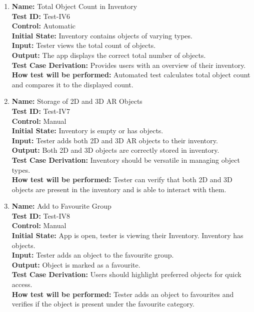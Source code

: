 \documentclass[12pt, titlepage]{article}
\begin{document}
\begin{enumerate}
  \item \textbf{Name:} Total Object Count in Inventory \label{itm:Test-IV6} \\
        \textbf{Test ID:} Test-IV6 \\
        \textbf{Control:} Automatic \\
        \textbf{Initial State:} Inventory contains objects of varying types. \\
        \textbf{Input:} Tester views the total count of objects. \\
        \textbf{Output:} The app displays the correct total number of objects. \\
        \textbf{Test Case Derivation:} Provides users with an overview of their inventory. \\
        \textbf{How test will be performed:} Automated test calculates total object count and compares it to the displayed count. \\

  \item \textbf{Name:} Storage of 2D and 3D AR Objects \label{itm:Test-IV7} \\
        \textbf{Test ID:} Test-IV7 \\
        \textbf{Control:} Manual \\
        \textbf{Initial State:} Inventory is empty or has objects. \\
        \textbf{Input:} Tester adds both 2D and 3D AR objects to their inventory. \\
        \textbf{Output:} Both 2D and 3D objects are correctly stored in inventory. \\
        \textbf{Test Case Derivation:} Inventory should be versatile in managing object types. \\
        \textbf{How test will be performed:} Tester can verify that both 2D and 3D objects are present in the inventory and is able to interact with them. \\

  \item \textbf{Name:} Add to Favourite Group \label{itm:Test-IV8} \\
        \textbf{Test ID:} Test-IV8 \\
        \textbf{Control:} Manual \\
        \textbf{Initial State:} App is open, tester is viewing their Inventory. Inventory has objects. \\
        \textbf{Input:} Tester adds an object to the favourite group. \\
        \textbf{Output:} Object is marked as a favourite. \\
        \textbf{Test Case Derivation:} Users should highlight preferred objects for quick access. \\
        \textbf{How test will be performed:} Tester adds an object to favourites and verifies if the object is present under the favourite category. \\


\end{enumerate}
\end{document}
